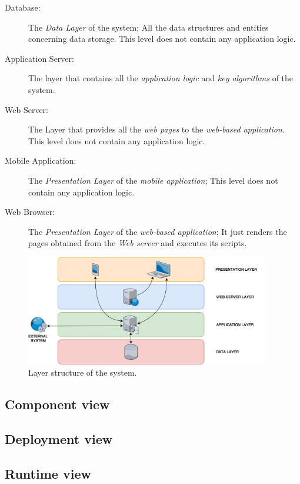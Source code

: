 \documentclass{article}
\begin{document}
	\begin{description}
	\item [Database:] The \textit{Data Layer} of the system; All the data structures and entities concerning data storage. This level does not contain any application logic.
	\item [Application Server:] The layer that contains all the \textit{application logic} and \textit{key algorithms} of the system.
	\item [Web Server:] The Layer that provides all the \textit{web pages} to the \textit{web-based application}. This level does not contain any application logic.
	\item [Mobile Application:] The \textit{Presentation Layer} of the \textit{mobile application}; This level does not contain any application logic.
	\item [Web Browser:] The \textit{Presentation Layer} of the \textit{web-based application}; It just renders the pages obtained from the \textit{Web server} and executes its scripts.
	\end{description}

	\bigskip
	\begin{figure}[ht]
	\centering
	\includegraphics[width=0.95\textwidth]{img/diagrams/layers.png}
	\caption{Layer structure of the system.}
	\end{figure}

	\bigskip

	\subsection{Component view}


	\subsection{Deployment view}


	\subsection{Runtime view}
\end{document}
